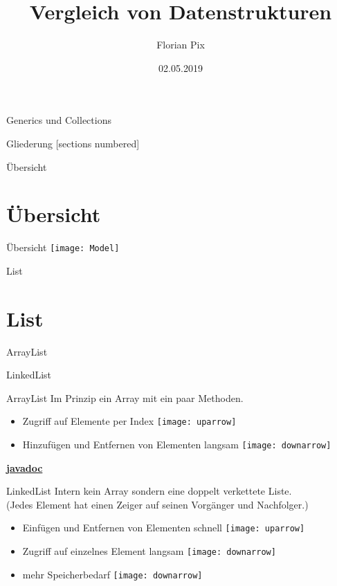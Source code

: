 \documentclass[10pt]{beamer}
\author{Florian Pix}
\institute{SWT Übung SoSe19}
\title{Vergleich von Datenstrukturen}
\date{02.05.2019}
\begin{document}
\begin{frame}{Generics und Collections}
    \titlepage
\end{frame}

\begin{frame}{Gliederung}
    [sections numbered]
    \tableofcontents
\end{frame}

\begin{frame}[fragile]{Übersicht}
    \section{Übersicht}
\end{frame}

\begin{frame}[fragile]{Übersicht}
\texttt{[image: Model]}
\end{frame}

\begin{frame}[fragile]{List}
    \section{List}
ArrayList

LinkedList
\end{frame}

\begin{frame}[fragile]{ArrayList}
Im Prinzip ein Array mit ein paar Methoden.

\begin{itemize}
\item Zugriff auf Elemente per Index \texttt{[image: uparrow]}
\item Hinzufügen und Entfernen von Elementen langsam \texttt{[image: downarrow]}
\end{itemize}

\textcolor{mymauve}{\textbf{\href{https://docs.oracle.com/javase/8/docs/api/java/util/ArrayList.html}{javadoc}}}
\end{frame}

\begin{frame}[fragile]{LinkedList}
Intern kein Array sondern eine doppelt verkettete Liste.\\
(Jedes Element hat einen Zeiger auf seinen Vorgänger und Nachfolger.)

\begin{itemize}
\item Einfügen und Entfernen von Elementen schnell \texttt{[image: uparrow]}
\item Zugriff auf einzelnes Element langsam \texttt{[image: downarrow]}
\item mehr Speicherbedarf \texttt{[image: downarrow]}
\end{itemize}
\end{frame}
\end{document}

